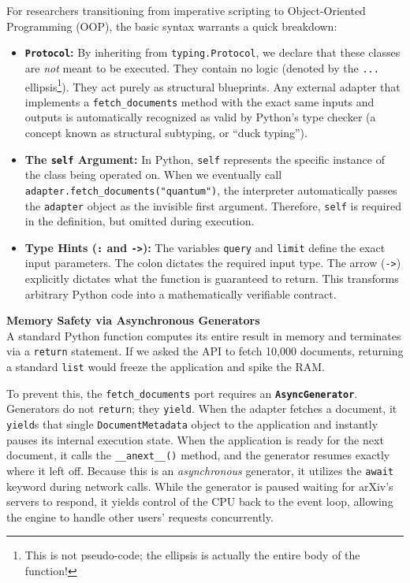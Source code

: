 For researchers transitioning from imperative scripting to Object-Oriented Programming (OOP), the basic syntax warrants a quick breakdown:
\begin{itemize}
    \item \textbf{\texttt{Protocol}:} By inheriting from \texttt{typing.Protocol}, we declare that these classes are \textit{not} meant to be executed. They contain no logic (denoted by the \texttt{...} ellipsis\footnote{This is not pseudo-code; the ellipsis is actually the entire body of the function!}). They act purely as structural blueprints. Any external adapter that implements a \texttt{fetch\_documents} method with the exact same inputs and outputs is automatically recognized as valid by Python's type checker (a concept known as structural subtyping, or ``duck typing'').
    \item \textbf{The \texttt{self} Argument:} In Python, \texttt{self} represents the specific instance of the class being operated on. When we eventually call \texttt{adapter.fetch\_documents("quantum")}, the interpreter automatically passes the \texttt{adapter} object as the invisible first argument. Therefore, \texttt{self} is required in the definition, but omitted during execution.
    \item \textbf{Type Hints (\texttt{:} and \texttt{->}):} The variables \texttt{query} and \texttt{limit} define the exact input parameters. The colon dictates the required input type. The arrow (\texttt{->}) explicitly dictates what the function is guaranteed to return. This transforms arbitrary Python code into a mathematically verifiable contract.
\end{itemize}

\textbf{Memory Safety via Asynchronous Generators} \\
A standard Python function computes its entire result in memory and terminates via a \texttt{return} statement. If we asked the API to fetch 10,000 documents, returning a standard \texttt{list} would freeze the application and spike the RAM.

To prevent this, the \texttt{fetch\_documents} port requires an \textbf{\texttt{AsyncGenerator}}. Generators do not \texttt{return}; they \texttt{yield}. When the adapter fetches a document, it \texttt{yield}s that single \texttt{DocumentMetadata} object to the application and instantly pauses its internal execution state. When the application is ready for the next document, it calls the \texttt{\_\_anext\_\_()} method, and the generator resumes exactly where it left off. Because this is an \textit{asynchronous} generator, it utilizes the \texttt{await} keyword during network calls. While the generator is paused waiting for arXiv's servers to respond, it yields control of the CPU back to the event loop, allowing the engine to handle other users' requests concurrently.

